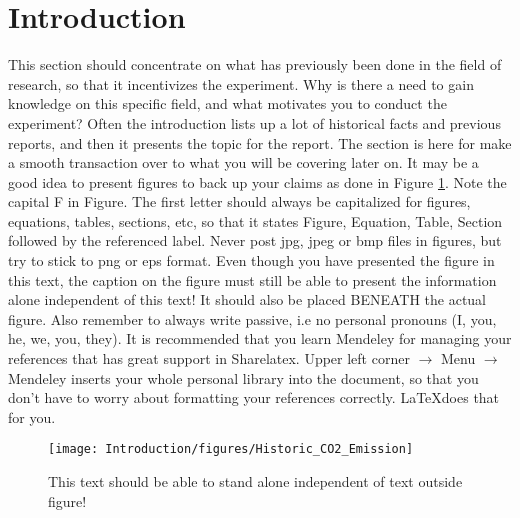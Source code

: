 \section{Introduction}
\label{sec:introduction}
\FloatBarrier %
This section should concentrate on what has previously been done in the field of research, so that it incentivizes the experiment. Why is there a need to gain knowledge on this specific field, and what motivates you to conduct the experiment? Often the introduction lists up a lot of historical facts and previous reports, and then it presents the topic for the report. The section is here for make a smooth transaction over to what you will be covering later on. It may be a good idea to present figures to back up your claims as done in Figure \ref{fig:intro_co2}. Note the capital F in Figure. The first letter should always be capitalized for figures, equations, tables, sections, etc, so that it states Figure, Equation, Table, Section followed by the referenced label. Never post jpg, jpeg or bmp files in figures, but try to stick to png or eps format. Even though you have presented the figure in this text, the caption on the figure must still be able to present the information alone independent of this text! It should also be placed BENEATH the actual figure. Also remember to always write passive, i.e no personal pronouns (I, you, he, we, you, they). It is recommended that you learn Mendeley for managing your references that has great support in Sharelatex. Upper left corner $\rightarrow$ Menu $\rightarrow$ Mendeley inserts your whole personal library into the document, so that you don't have to worry about formatting your references correctly. \LaTeX does that for you.
\begin{figure}[htb] %
    \centering
    \texttt{[image: Introduction/figures/Historic\_CO2\_Emission]}
    \caption{This text should be able to stand alone independent of text outside figure!}
    \label{fig:intro_co2}
\end{figure}